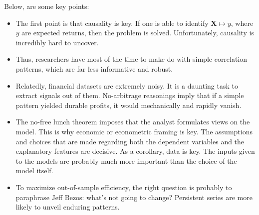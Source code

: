 Below, are some key points: 
\begin{itemize}
    \item The first point is that causality is key. If  one is able to identify $\mathbf{X} \mapsto y$, where $y$ are expected returns, then the problem is solved. Unfortunately, causality is incredibly hard to uncover.
    \item Thus, researchers have most of the time to make do with simple correlation patterns, which are far less informative and robust.
    \item Relatedly, financial datasets are extremely noisy. It is a daunting task to extract signals out of them. No-arbitrage reasonings imply that if a simple pattern yielded durable profits, it would mechanically and rapidly vanish.
    \item The no-free lunch theorem imposes that the analyst formulates views on the model. This is why economic or econometric framing is key. The assumptions and choices that are made regarding both the dependent variables and the explanatory features are decisive. As a corollary, data is key. The inputs given to the models are probably much more important than the choice of the model itself.
    \item To maximize out-of-sample efficiency, the right question is probably to paraphrase Jeff Bezos: what's not going to change? Persistent series are more likely to unveil enduring patterns.
\end{itemize}

